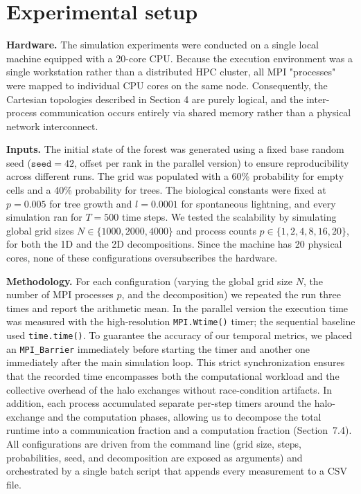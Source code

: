 \section{Experimental setup}
\textbf{Hardware.} The simulation experiments were conducted on a single local machine equipped with a 20-core CPU. Because the execution environment was a single workstation rather than a distributed HPC cluster, all MPI "processes" were mapped to individual CPU cores on the same node. Consequently, the Cartesian topologies described in Section 4 are purely logical, and the inter-process communication occurs entirely via shared memory rather than a physical network interconnect.

\textbf{Inputs.} The initial state of the forest was generated using a fixed base random seed ($\texttt{seed} = 42$, offset per rank in the parallel version) to ensure reproducibility across different runs. The grid was populated with a 60\% probability for empty cells and a 40\% probability for trees. The biological constants were fixed at $p = 0.005$ for tree growth and $l = 0.0001$ for spontaneous lightning, and every simulation ran for $T = 500$ time steps. We tested the scalability by simulating global grid sizes $N \in \{1000, 2000, 4000\}$ and process counts $p \in \{1, 2, 4, 8, 16, 20\}$, for both the 1D and the 2D decompositions. Since the machine has 20 physical cores, none of these configurations oversubscribes the hardware.

\textbf{Methodology.} For each configuration (varying the global grid size $N$, the number of MPI processes $p$, and the decomposition) we repeated the run three times and report the arithmetic mean. In the parallel version the execution time was measured with the high-resolution \texttt{MPI.Wtime()} timer; the sequential baseline used \texttt{time.time()}. To guarantee the accuracy of our temporal metrics, we placed an \texttt{MPI\_Barrier} immediately before starting the timer and another one immediately after the main simulation loop. This strict synchronization ensures that the recorded time encompasses both the computational workload and the collective overhead of the halo exchanges without race-condition artifacts. In addition, each process accumulated separate per-step timers around the halo-exchange and the computation phases, allowing us to decompose the total runtime into a communication fraction and a computation fraction (Section~7.4). All configurations are driven from the command line (grid size, steps, probabilities, seed, and decomposition are exposed as arguments) and orchestrated by a single batch script that appends every measurement to a CSV file.